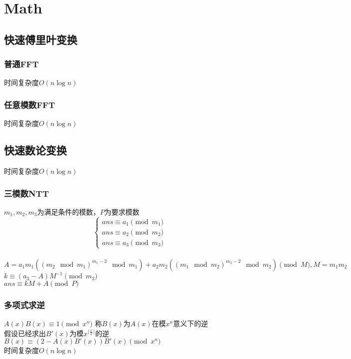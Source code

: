 \section{Math}

\subsection{快速傅里叶变换}
\subsubsection{普通FFT}
时间复杂度$O(n \log n)$\\

\subsubsection{任意模数FFT}
时间复杂度$O(n\log n)$\\

\subsection{快速数论变换}
时间复杂度$O(n\log n)$\\


\subsubsection{三模数NTT}
$m_1,m_2,m_3$为满足条件的模数，$P$为要求模数\\
$$
 \left\{
\begin{aligned}
ans \equiv a_1 \pmod{m_1} \\
ans \equiv a_2 \pmod{m_2} \\
ans \equiv a_3 \pmod{m_3}
\end{aligned}
\right.
$$\\
$A = a_1m_1((m_2 \mod m_1)^{m_1-2}\mod m_1) + a_2m_2((m_1 \mod m_2)^{m_2-2}\mod m_2) \pmod{M}, M = m_1m_2$\\
$k \equiv (a_3-A)M^{-1} \pmod{m_3}$\\
$ans \equiv kM + A \pmod{P}$\\



\subsubsection{多项式求逆}
$A(x)B(x)\equiv 1 \pmod{x^n}$ 称$B(x)$为$A(x)$在模$x^n$意义下的逆\\
假设已经求出$B'(x)$为模$x^{\lceil\frac{x}{2}\rceil}$的逆\\
$B(x)\equiv (2-A(x)B'(x))B'(x) \pmod{x^{n}}$\\
时间复杂度$O(n\log n)$\\


